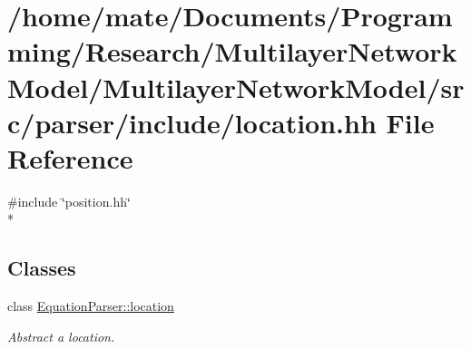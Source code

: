 \hypertarget{location_8hh}{}\section{/home/mate/\+Documents/\+Programming/\+Research/\+Multilayer\+Network\+Model/\+Multilayer\+Network\+Model/src/parser/include/location.hh File Reference}
\label{location_8hh}
{\ttfamily \#include \char`\"{}position.\+hh\char`\"{}}\\*
\subsection*{Classes}
\begin{DoxyCompactItemize}
\item 
class \hyperlink{classEquationParser_1_1location}{Equation\+Parser\+::location}
\begin{DoxyCompactList}\small\item\em Abstract a location. \end{DoxyCompactList}\end{DoxyCompactItemize}
